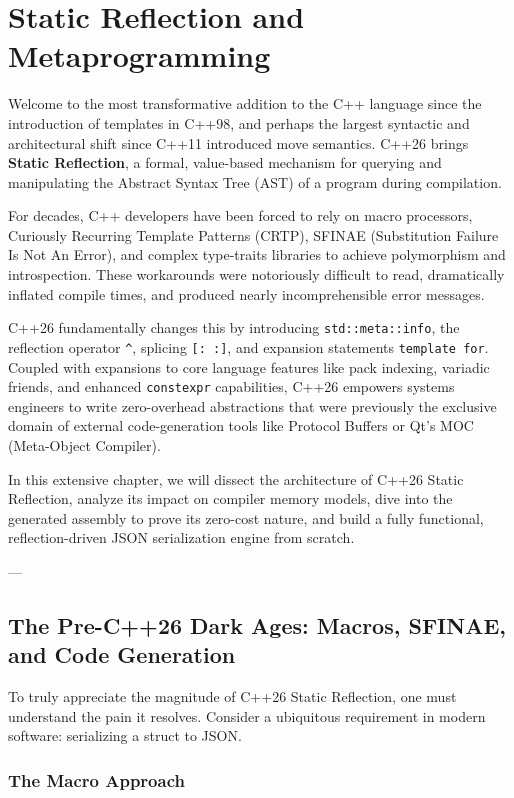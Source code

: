 \chapter{Static Reflection and Metaprogramming}

Welcome to the most transformative addition to the C++ language since the introduction of templates in C++98, and perhaps the largest syntactic and architectural shift since C++11 introduced move semantics. C++26 brings \textbf{Static Reflection}, a formal, value-based mechanism for querying and manipulating the Abstract Syntax Tree (AST) of a program during compilation. 

For decades, C++ developers have been forced to rely on macro processors, Curiously Recurring Template Patterns (CRTP), SFINAE (Substitution Failure Is Not An Error), and complex type-traits libraries to achieve polymorphism and introspection. These workarounds were notoriously difficult to read, dramatically inflated compile times, and produced nearly incomprehensible error messages.

C++26 fundamentally changes this by introducing \texttt{std::meta::info}, the reflection operator \texttt{^}, splicing \texttt{[: :]}, and expansion statements \texttt{template for}. Coupled with expansions to core language features like pack indexing, variadic friends, and enhanced \texttt{constexpr} capabilities, C++26 empowers systems engineers to write zero-overhead abstractions that were previously the exclusive domain of external code-generation tools like Protocol Buffers or Qt's MOC (Meta-Object Compiler).

In this extensive chapter, we will dissect the architecture of C++26 Static Reflection, analyze its impact on compiler memory models, dive into the generated assembly to prove its zero-cost nature, and build a fully functional, reflection-driven JSON serialization engine from scratch.

---

\section{The Pre-C++26 Dark Ages: Macros, SFINAE, and Code Generation}

To truly appreciate the magnitude of C++26 Static Reflection, one must understand the pain it resolves. Consider a ubiquitous requirement in modern software: serializing a struct to JSON. 

\subsection{The Macro Approach}

